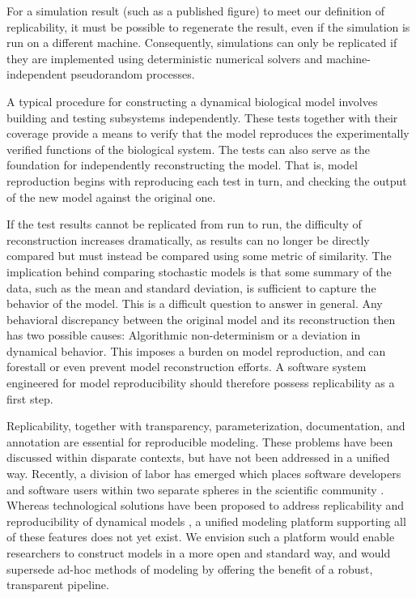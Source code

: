 \documentclass[journal,transmag,twoside]{IEEEtran}
\begin{document}
For a simulation result (such as a published figure) to meet our definition of replicability,
it must be possible to regenerate the result,
even if the simulation is run on a different machine.
Consequently, simulations can only be replicated if they are implemented using deterministic numerical solvers and
machine-independent pseudorandom processes.

A typical procedure for constructing a dynamical biological model
involves building and testing subsystems independently.
These tests together with their coverage provide a means to verify
that the model reproduces the experimentally verified functions of the biological system.
The tests can also serve as the foundation for independently reconstructing the model.
That is, model reproduction begins with reproducing each test in turn, and checking
the output of the new model against the original one.

If the test results cannot be replicated from run to run, the difficulty of reconstruction
increases dramatically, as results can no longer be directly compared but must instead
be compared using some metric of similarity.
The implication behind comparing stochastic models is that some summary of the data,
such as the mean and standard deviation, is sufficient to capture the behavior of the
model.
This is a difficult question to answer in general.
Any behavioral discrepancy between the original model and its reconstruction
then has two possible causes: Algorithmic non-determinism or a deviation in dynamical
behavior.
This imposes a burden on model reproduction, and can forestall or even prevent
model reconstruction efforts.
A software system engineered for model reproducibility should therefore possess
replicability as a first step.

Replicability, together with transparency, parameterization, documentation,
and annotation are essential for reproducible modeling.
These problems have been discussed within disparate contexts, but
have not been addressed in a unified way.
Recently, a division of labor has emerged which places software developers and
software users within two separate spheres in the scientific community \cite{mesirov2010computer}.
Whereas technological solutions have been proposed to address replicability and reproducibility
of dynamical models \cite{bergmann2014combine} \cite{waltemath2011minimum} \cite{novere2005minimum},
a unified modeling platform supporting all of these features does not yet exist.
We envision such a platform would enable researchers to construct models in a
more open and standard way, and would supersede ad-hoc methods of modeling by
offering the benefit of a robust, transparent pipeline.
\end{document}
